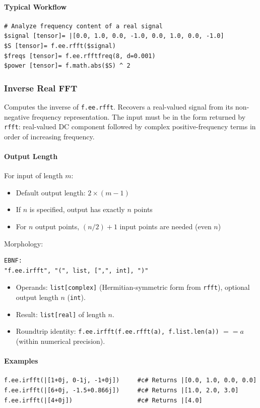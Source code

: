 \paragraph{Typical Workflow}
\begin{verbatim}
# Analyze frequency content of a real signal
$signal [tensor]= |[0.0, 1.0, 0.0, -1.0, 0.0, 1.0, 0.0, -1.0]
$S [tensor]= f.ee.rfft($signal)
$freqs [tensor]= f.ee.rfftfreq(8, d=0.001)
$power [tensor]= f.math.abs($S) ^ 2
\end{verbatim}

\subsubsection{Inverse Real FFT}
\label{sec:irfft}
Computes the inverse of \texttt{f.ee.rfft}. Recovers a real-valued signal from its non-negative frequency representation. The input must be in the form returned by \texttt{rfft}: real-valued DC component followed by complex positive-frequency terms in order of increasing frequency.

\paragraph{Output Length}
For input of length $m$:
\begin{itemize}
\item Default output length: $2 \times (m-1)$
\item If $n$ is specified, output has exactly $n$ points
\item For $n$ output points, $(n/2)+1$ input points are needed (even $n$)
\end{itemize}

Morphology:
\begin{verbatim}
EBNF:
"f.ee.irfft", "(", list, [",", int], ")"
\end{verbatim}
\begin{itemize}
\item Operands: \texttt{list[complex]} (Hermitian-symmetric form from \texttt{rfft}), optional output length $n$ (\texttt{int}).
\item Result: \texttt{list[real]} of length $n$.
\item Roundtrip identity: \texttt{f.ee.irfft(f.ee.rfft(a), f.list.len(a))} $== a$ (within numerical precision).
\end{itemize}

\paragraph{Examples}
\begin{verbatim}
f.ee.irfft(|[1+0j, 0-1j, -1+0j])     #c# Returns |[0.0, 1.0, 0.0, 0.0]
f.ee.irfft(|[6+0j, -1.5+0.866j])     #c# Returns |[1.0, 2.0, 3.0]
f.ee.irfft(|[4+0j])                  #c# Returns |[4.0]
\end{verbatim}

